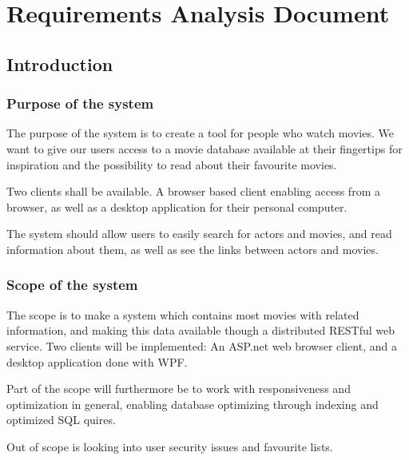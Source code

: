 \chapter{Requirements Analysis Document}

\section{Introduction}
\label{sec:introduction}



\subsection{Purpose of the system}

The purpose of the system is to create a tool for people who watch movies. We want to give our users access to a movie database available at their fingertips for inspiration and the possibility to read about their favourite movies.

Two clients shall be available. A browser based client enabling access from a browser, as well as a desktop application for their personal computer.  

The system should allow users to easily search for actors and movies, and read information about them, as well as see the links between actors and movies.




\subsection{Scope of the system}

The scope is to make a system which contains most movies with related information, and making this data available though a distributed RESTful web service. Two clients will be implemented: An ASP.net web browser client, and a desktop application done with WPF.

Part of the scope will furthermore be to work with responsiveness and optimization in general, enabling database optimizing through indexing and optimized SQL quires.


Out of scope is looking into user security issues and favourite lists.

